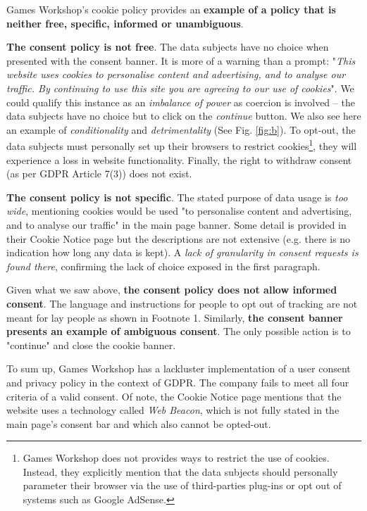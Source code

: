\documentclass[twocolumn, letterpaper]{scrartcl}
\begin{document}
	    Games Workshop's cookie policy provides an \textbf{example of a policy that is neither free, specific, informed or unambiguous}.
	
    	\textbf{The consent policy is not free}. The data subjects have no choice when presented with the consent banner. It is more of a warning than a prompt: "\textit{This website uses cookies to personalise content and advertising, and to analyse our traffic. By continuing to use this site you are agreeing to our use of cookies}". We could qualify this instance as an \textit{imbalance of power} as coercion is involved -- the data subjects have no choice but to click on the \textit{continue} button. We also see here an example of \textit{conditionality} and \textit{detrimentality} (See Fig. \ref{fig:b}). To opt-out, the data subjects must personally set up their browsers to restrict cookies\footnote{Games Workshop does not provides ways to restrict the use of cookies. Instead, they explicitly mention that the data subjects should personally parameter their browser via the use of third-parties plug-ins or opt out of systems such as Google AdSense.}, they will experience a loss in website functionality. Finally, the right to withdraw consent (as per GDPR Article 7(3)) does not exist.
    	
    	\textbf{The consent policy is not specific}. The stated purpose of data usage is \textit{too wide}, mentioning cookies would be used "to personalise content and advertising, and to analyse our traffic" in the main page banner. Some detail is provided in their Cookie Notice page\cite{GW_CN} but the descriptions are not extensive (e.g. there is no indication how long any data is kept). A \textit{lack of granularity in consent requests is found there}, confirming the lack of choice exposed in the first paragraph.
    	
    	Given what we saw above, \textbf{the consent policy does not allow informed consent}. The language and instructions for people to opt out of tracking are not meant for lay people as shown in Footnote 1. Similarly, \textbf{the consent banner presents an example of ambiguous consent}. The only possible action is to "continue" and close the cookie banner.
    	
    	To sum up, Games Workshop has a lackluster implementation of a user consent and privacy policy in the context of GDPR. The company fails to meet all four criteria of a valid consent. Of note, the Cookie Notice page mentions that the website uses a technology called \textit{Web Beacon}, which is not fully stated in the main page's consent bar and which also cannot be opted-out.
 	
\end{document}
